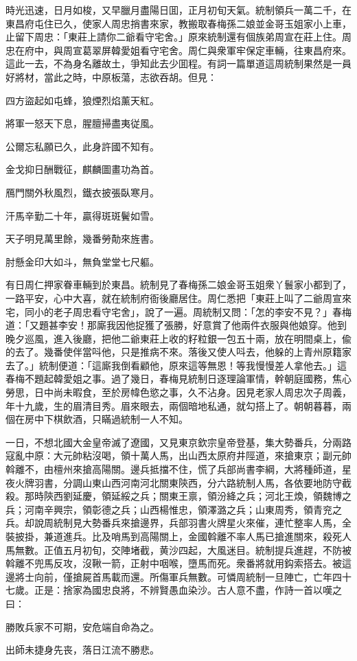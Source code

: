 時光迅速，日月如梭，又早臘月盡陽日囬，正月初旬天氣。統制領兵一萬二千，在東昌府屯住已久，使家人周忠捎書來家，教搬取春梅孫二娘並金哥玉姐家小上車，止留下周忠：「東莊上請你二爺看守宅舍。」原來統制還有個族弟周宣在莊上住。周忠在府中，與周宣葛翠屏韓愛姐看守宅舍。周仁與衆軍牢保定車輛，往東昌府來。這此一去，不為身名離故土，爭知此去少囬程。有詞一篇單道這周統制果然是一員好將材，當此之時，中原板蕩，志欲吞胡。但見：
\begin{myquote}
四方盜起如屯蜂，狼煙烈焰薰天紅。

將軍一怒天下息，腥膻掃盡夷従風。

公爾忘私願已久，此身許國不知有。

金戈抑日酬戰征，麒麟圖畫功為首。

鴈門關外秋風烈，鐵衣披張臥寒月。

汗馬辛勤二十年，贏得斑斑鬢如雪。

天子明見萬里餘，幾番勞勣來旌書。

肘懸金印大如斗，無負堂堂七尺軀。
\end{myquote}

有日周仁押家眷車輛到於東昌。統制見了春梅孫二娘金哥玉姐衆丫鬟家小都到了，一路平安，心中大喜，就在統制府衙後廳居住。周仁悉把「東莊上叫了二爺周宣來宅，同小的老子周忠看守宅舍」，說了一遍。周統制又問：「怎的李安不見？」春梅道：「又題甚李安！那廝我因他捉獲了張勝，好意賞了他兩件衣服與他娘穿。他到晚夕巡風，進入後廳，把他二爺東莊上收的籽粒銀一包五十兩，放在明間桌上，偸的去了。幾番使伴當呌他，只是推病不來。落後又使人呌去，他躲的上青州原籍家去了。」統制便道：「這廝我倒看顧他，原來這等無恩！等我慢慢差人拿他去。」這春梅不題起韓愛姐之事。過了幾日，春梅見統制日逐理論軍情，幹朝庭國務，焦心勞思，日中尚未暇食，至於房幃色慾之事，久不沾身。因見老家人周忠次子周義，年十九歲，生的眉清目秀。眉來眼去，兩個暗地私通，就勾搭上了。朝朝暮暮，兩個在房中下棋飲酒，只瞞過統制一人不知。

一日，不想北國大金皇帝滅了遼國，又見東京欽宗皇帝登基，集大勢番兵，分兩路寇亂中原：大元帥粘沒喝，領十萬人馬，出山西太原府井陘道，來搶東京；副元帥斡離不，由檀州來搶高陽關。邊兵抵擋不住，慌了兵部尚書李綱，大將種師道，星夜火牌羽書，分調山東山西河南河北關東陝西，分六路統制人馬，各依要地防守截殺。那時陝西劉延慶，領延綏之兵；關東王禀，領汾絳之兵；河北王煥，領魏博之兵；河南辛興宗，領彰德之兵；山西楊惟忠，領澤潞之兵；山東周秀，領青兖之兵。却說周統制見大勢番兵來搶邊界，兵部羽書火牌星火來催，連忙整率人馬，全裝披掛，兼道進兵。比及哨馬到高陽關上，金國斡離不率人馬已搶進關來，殺死人馬無數。正值五月初旬，交陣堵截，黄沙四起，大風迷目。統制提兵進趕，不防被斡離不兜馬反攻，沒鞦一箭，正射中咽喉，墮馬而死。衆番將就用鈎索搭去。被這邊將士向前，僅搶屍首馬載而還。所傷軍兵無數。可憐周統制一旦陣亡，亡年四十七歲。正是：捨家為國忠良將，不辨賢愚血染沙。古人意不盡，作詩一首以嘆之曰：
\begin{myquote}
勝敗兵家不可期，安危端自命為之。

出師未捷身先丧，落日江流不勝悲。
\end{myquote}

